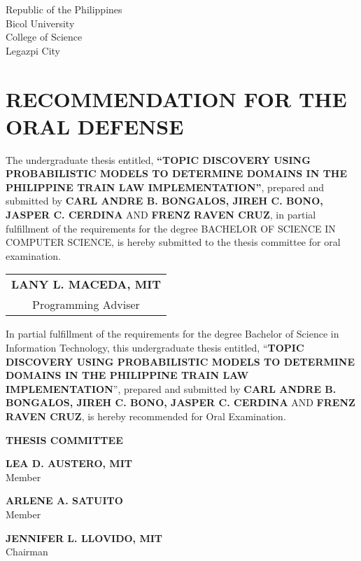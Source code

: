 


\begin{center}
	{	Republic of the Philippines \\
		Bicol University \\
		College of Science \\
		Legazpi City \\[0.5ex]}
\end{center}                

\section{\normalsize{RECOMMENDATION FOR THE ORAL DEFENSE}}
\begin{spacing}{1.5}
	The undergraduate thesis entitled, \textbf{“TOPIC DISCOVERY USING PROBABILISTIC MODELS TO DETERMINE DOMAINS IN THE PHILIPPINE TRAIN LAW IMPLEMENTATION”}, prepared and submitted by \textbf{CARL ANDRE B. BONGALOS, JIREH C. BONO, JASPER C. CERDINA} AND \textbf{FRENZ RAVEN CRUZ}, in partial fulfillment of the requirements for the degree BACHELOR OF SCIENCE IN COMPUTER SCIENCE, is hereby submitted to the thesis committee for oral examination.
	
	\begin{flushright}
			\begin{tabular}{c}
				\textbf{LANY L. MACEDA, MIT}\\
				Programming Adviser
			\end{tabular}
	\end{flushright}
		
	\end{spacing}
	
	\begin{spacing}{1.5}
		In partial fulfillment of the requirements for the degree Bachelor of Science in Information Technology, this undergraduate thesis entitled, “\textbf{TOPIC DISCOVERY USING PROBABILISTIC MODELS TO DETERMINE DOMAINS IN THE PHILIPPINE TRAIN LAW IMPLEMENTATION}”, prepared and submitted by \textbf{CARL ANDRE B. BONGALOS, JIREH C. BONO, JASPER C. CERDINA} AND \textbf{FRENZ RAVEN CRUZ}, is hereby recommended for Oral Examination. 
	\end{spacing}
\vspace{1ex}
	\begin{center}
		\textbf{THESIS COMMITTEE}
	\end{center}
	
	\vspace{12pt}
	
	\begin{multicols}{2}
		\centering
		\textbf{LEA D. AUSTERO, MIT}\\
		Member
		\vspace{5pt}
		
		\textbf{ARLENE A. SATUITO} \\
		Member
	\end{multicols}
	
	
	
	\begin{center}
		\textbf{JENNIFER L. LLOVIDO, MIT} \\
		Chairman
	\end{center}
	
